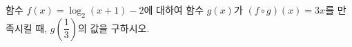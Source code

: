 함수 $f(x)=\log_2 (x+1)-2$에 대하여 함수 $g(x)$가 $(f\circ g)(x)=3x$를 만족시킬 때, $g\!\left(\dfrac{1}{3}\right)$의 값을 구하시오.
